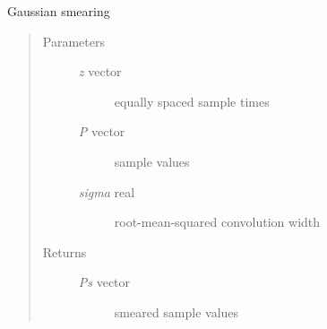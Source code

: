 \documentclass[letterpaper,10pt,english]{sphinxmanual}
\begin{document}

\begin{fulllineitems}
\label{api/polymer:refl1d.polymer.smear}
Gaussian smearing
\begin{quote}\begin{description}
\item[{Parameters }] \leavevmode\begin{description}
\item[{\emph{z} \textbar{} vector}] \leavevmode
equally spaced sample times

\item[{\emph{P} \textbar{} vector}] \leavevmode
sample values

\item[{\emph{sigma} \textbar{} real}] \leavevmode
root-mean-squared convolution width

\end{description}

\item[{Returns }] \leavevmode\begin{description}
\item[{\emph{Ps} \textbar{} vector}] \leavevmode
smeared sample values

\end{description}

\end{description}\end{quote}

\end{fulllineitems}
\end{document}
